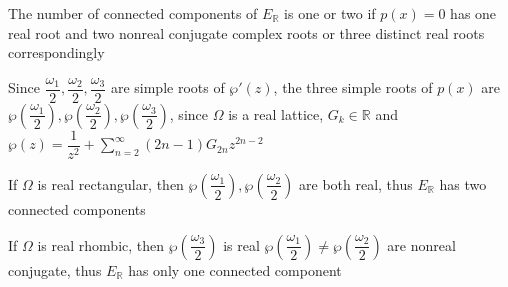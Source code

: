 \documentclass[../main.tex]{subfiles}
\begin{document}
\begin{problem}
The number of connected components of $E_\mathbb{R}$ is one or two if $p(x)=0$ has one real root and two nonreal conjugate complex roots or three distinct real roots correspondingly \par
Since $\dfrac{\omega_1}{2},\dfrac{\omega_2}{2},\dfrac{\omega_3}{2}$ are simple roots of $\wp'(z)$, the three simple roots of $p(x)$ are $\wp\left(\dfrac{\omega_1}{2}\right),\wp\left(\dfrac{\omega_2}{2}\right),\wp\left(\dfrac{\omega_3}{2}\right)$, since $\Omega$ is a real lattice, $G_k\in\mathbb{R}$ and $\wp(z)=\dfrac{1}{z^2}+\sum_{n=2}^{\infty}(2n-1)G_{2n}z^{2n-2}$ \par
If $\Omega$ is real rectangular, then $\wp\left(\dfrac{\omega_1}{2}\right),\wp\left(\dfrac{\omega_2}{2}\right)$ are both real, thus $E_\mathbb{R}$ has two connected components \par
If $\Omega$ is real rhombic, then $\wp\left(\dfrac{\omega_3}{2}\right)$ is real $\wp\left(\dfrac{\omega_1}{2}\right)\neq\wp\left(\dfrac{\omega_2}{2}\right)$ are nonreal conjugate, thus $E_\mathbb{R}$ has only one connected component \par
\end{problem}
\end{document}
